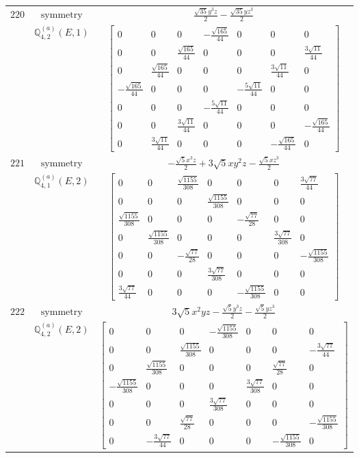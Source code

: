 \documentclass[fleqn,8pt,landscape]{jsarticle}
\begin{document}
\begin{longtable}{ccc}
$ 220 $ & $ \text{symmetry} $ & $ \frac{\sqrt{35} y^{3} z}{2} - \frac{\sqrt{35} y z^{3}}{2} $ \\
$  $ & $ \mathbb{Q}_{4,2}^{(a)}(E,1) $ & $ \begin{bmatrix} 0 & 0 & 0 & - \frac{\sqrt{165}}{44} & 0 & 0 & 0 \\ 0 & 0 & \frac{\sqrt{165}}{44} & 0 & 0 & 0 & \frac{3 \sqrt{11}}{44} \\ 0 & \frac{\sqrt{165}}{44} & 0 & 0 & 0 & \frac{3 \sqrt{11}}{44} & 0 \\ - \frac{\sqrt{165}}{44} & 0 & 0 & 0 & - \frac{5 \sqrt{11}}{44} & 0 & 0 \\ 0 & 0 & 0 & - \frac{5 \sqrt{11}}{44} & 0 & 0 & 0 \\ 0 & 0 & \frac{3 \sqrt{11}}{44} & 0 & 0 & 0 & - \frac{\sqrt{165}}{44} \\ 0 & \frac{3 \sqrt{11}}{44} & 0 & 0 & 0 & - \frac{\sqrt{165}}{44} & 0 \end{bmatrix} $ \\ \hline
$ 221 $ & $ \text{symmetry} $ & $ - \frac{\sqrt{5} x^{3} z}{2} + 3 \sqrt{5} x y^{2} z - \frac{\sqrt{5} x z^{3}}{2} $ \\
$  $ & $ \mathbb{Q}_{4,1}^{(a)}(E,2) $ & $ \begin{bmatrix} 0 & 0 & \frac{\sqrt{1155}}{308} & 0 & 0 & 0 & \frac{3 \sqrt{77}}{44} \\ 0 & 0 & 0 & \frac{\sqrt{1155}}{308} & 0 & 0 & 0 \\ \frac{\sqrt{1155}}{308} & 0 & 0 & 0 & - \frac{\sqrt{77}}{28} & 0 & 0 \\ 0 & \frac{\sqrt{1155}}{308} & 0 & 0 & 0 & \frac{3 \sqrt{77}}{308} & 0 \\ 0 & 0 & - \frac{\sqrt{77}}{28} & 0 & 0 & 0 & - \frac{\sqrt{1155}}{308} \\ 0 & 0 & 0 & \frac{3 \sqrt{77}}{308} & 0 & 0 & 0 \\ \frac{3 \sqrt{77}}{44} & 0 & 0 & 0 & - \frac{\sqrt{1155}}{308} & 0 & 0 \end{bmatrix} $ \\ \hline
$ 222 $ & $ \text{symmetry} $ & $ 3 \sqrt{5} x^{2} y z - \frac{\sqrt{5} y^{3} z}{2} - \frac{\sqrt{5} y z^{3}}{2} $ \\
$  $ & $ \mathbb{Q}_{4,2}^{(a)}(E,2) $ & $ \begin{bmatrix} 0 & 0 & 0 & - \frac{\sqrt{1155}}{308} & 0 & 0 & 0 \\ 0 & 0 & \frac{\sqrt{1155}}{308} & 0 & 0 & 0 & - \frac{3 \sqrt{77}}{44} \\ 0 & \frac{\sqrt{1155}}{308} & 0 & 0 & 0 & \frac{\sqrt{77}}{28} & 0 \\ - \frac{\sqrt{1155}}{308} & 0 & 0 & 0 & \frac{3 \sqrt{77}}{308} & 0 & 0 \\ 0 & 0 & 0 & \frac{3 \sqrt{77}}{308} & 0 & 0 & 0 \\ 0 & 0 & \frac{\sqrt{77}}{28} & 0 & 0 & 0 & - \frac{\sqrt{1155}}{308} \\ 0 & - \frac{3 \sqrt{77}}{44} & 0 & 0 & 0 & - \frac{\sqrt{1155}}{308} & 0 \end{bmatrix} $ \\ \hline

\end{longtable}
\end{document}
